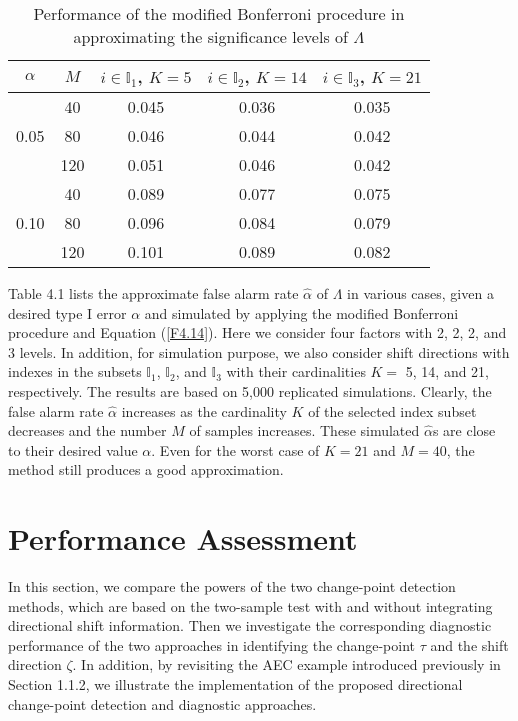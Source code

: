 \begin{table}[!ht]
\tabcolsep 8.5pt \vspace{-0.1cm} \centering \caption{Performance of the modified
Bonferroni procedure in approximating the significance levels of $\Lambda$}
\vspace{0.3cm}
\renewcommand{\arraystretch}{1.25}
\begin{tabular}{c|c|ccc}\hline
$\alpha$ & $M$ & $i\in\mathbb{I}_1$, $K=5$ & $i\in\mathbb{I}_2$, $K=14$ &
$i\in\mathbb{I}_3$, $K=21$
\\\hline
& 40 & 0.045 & 0.036 & 0.035\\
0.05 & 80 & 0.046 & 0.044 & 0.042\\
& 120 & 0.051 & 0.046 & 0.042
\\\hline
& 40 & 0.089 & 0.077 & 0.075\\
0.10 & 80 & 0.096 & 0.084 & 0.079\\
& 120 & 0.101 & 0.089 & 0.082
\\\hline
\end{tabular}
\end{table}

Table 4.1 lists the approximate false alarm rate $\hat{\alpha}$ of $\Lambda$ in
various cases, given a desired type I error $\alpha$ and simulated by applying the
modified Bonferroni procedure and Equation (\ref{F4.14}). Here we consider four
factors with 2, 2, 2, and 3 levels. In addition, for simulation purpose, we also
consider shift directions with indexes in the subsets $\mathbb{I}_1$,
$\mathbb{I}_2$, and $\mathbb{I}_3$ with their cardinalities $K=$ 5, 14, and 21,
respectively. The results are based on 5,000 replicated simulations. Clearly, the
false alarm rate $\hat{\alpha}$ increases as the cardinality $K$ of the selected
index subset decreases and the number $M$ of samples increases. These simulated
$\hat{\alpha}$s are close to their desired value $\alpha$. Even for the worst case
of $K=21$ and $M=40$, the method still produces a good approximation.



\section{Performance Assessment}\label{sec4.5}

In this section, we compare the powers of the two change-point detection methods,
which are based on the two-sample test with and without integrating directional
shift information. Then we investigate the corresponding diagnostic performance of
the two approaches in identifying the change-point $\tau$ and the shift direction
$\zeta$. In addition, by revisiting the AEC example introduced previously in Section
1.1.2, we illustrate the implementation of the proposed directional change-point
detection and diagnostic approaches.

